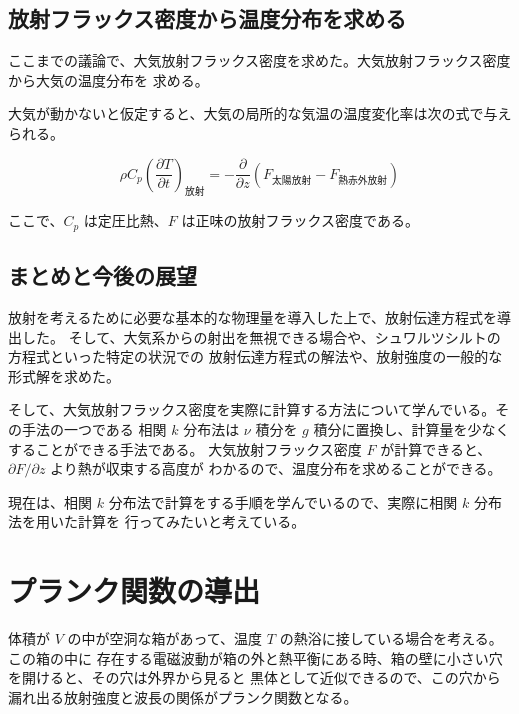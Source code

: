 \documentclass[book]{dennou777}
\begin{document}
\section{放射フラックス密度から温度分布を求める}
ここまでの議論で、大気放射フラックス密度を求めた。大気放射フラックス密度から大気の温度分布を
求める。

大気が動かないと仮定すると、大気の局所的な気温の温度変化率は次の式で与えられる。

\begin{equation}
	\rho C_p\left(\frac{\partial T}{\partial t}\right)_\text{放射}
	=-\frac{\partial}{\partial z}(F_\text{太陽放射}-F_\text{熱赤外放射})
\end{equation}

ここで、\(C_p\) は定圧比熱、\(F\) は正味の放射フラックス密度である。

\section{まとめと今後の展望}

放射を考えるために必要な基本的な物理量を導入した上で、放射伝達方程式を導出した。
そして、大気系からの射出を無視できる場合や、シュワルツシルトの方程式といった特定の状況での
放射伝達方程式の解法や、放射強度の一般的な形式解を求めた。

そして、大気放射フラックス密度を実際に計算する方法について学んでいる。その手法の一つである
相関 \(k\) 分布法は \(\nu\) 積分を \(g\) 積分に置換し、計算量を少なくすることができる手法である。
大気放射フラックス密度 \(F\) が計算できると、\(\partial F/\partial z\) より熱が収束する高度が
わかるので、温度分布を求めることができる。

現在は、相関 \(k\) 分布法で計算をする手順を学んでいるので、実際に相関 \(k\) 分布法を用いた計算を
行ってみたいと考えている。

\clearpage
\appendix
\chapter{プランク関数の導出}
体積が \(V\) の中が空洞な箱があって、温度 \(T\) の熱浴に接している場合を考える。この箱の中に
存在する電磁波動が箱の外と熱平衡にある時、箱の壁に小さい穴を開けると、その穴は外界から見ると
黒体として近似できるので、この穴から漏れ出る放射強度と波長の関係がプランク関数となる。
\end{document}
